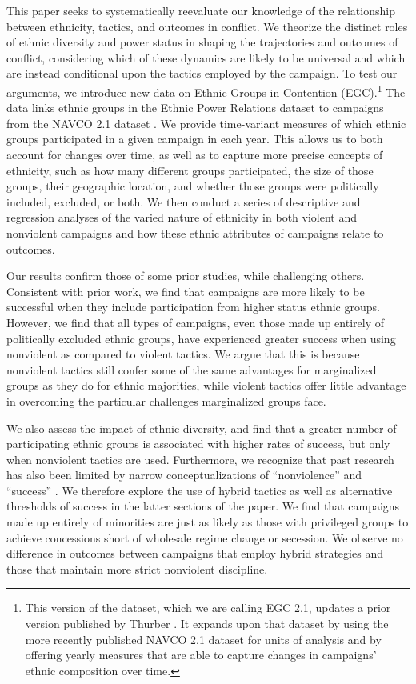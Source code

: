 \documentclass[
  letterpaper,
  DIV=11,
  numbers=noendperiod]{scrartcl}
\begin{document}
This paper seeks to systematically reevaluate our knowledge of the
relationship between ethnicity, tactics, and outcomes in conflict. We
theorize the distinct roles of ethnic diversity and power status in
shaping the trajectories and outcomes of conflict, considering which of
these dynamics are likely to be universal and which are instead
conditional upon the tactics employed by the campaign. To test our
arguments, we introduce new data on Ethnic Groups in Contention
(EGC).\footnote{This version of the dataset, which we are calling EGC
  2.1, updates a prior version published by Thurber
  \autocite*{Thurber2018}. It expands upon that dataset by using the
  more recently published NAVCO 2.1 dataset for units of analysis and by
  offering yearly measures that are able to capture changes in
  campaigns' ethnic composition over time.} The data links ethnic groups
in the Ethnic Power Relations dataset \autocite{Vogt2015} to campaigns
from the NAVCO 2.1 dataset \autocite{Chenoweth2022}. We provide
time-variant measures of which ethnic groups participated in a given
campaign in each year. This allows us to both account for changes over
time, as well as to capture more precise concepts of ethnicity, such as
how many different groups participated, the size of those groups, their
geographic location, and whether those groups were politically included,
excluded, or both. We then conduct a series of descriptive and
regression analyses of the varied nature of ethnicity in both violent
and nonviolent campaigns and how these ethnic attributes of campaigns
relate to outcomes.

Our results confirm those of some prior studies, while challenging
others. Consistent with prior work, we find that campaigns are more
likely to be successful when they include participation from higher
status ethnic groups. However, we find that all types of campaigns, even
those made up entirely of politically excluded ethnic groups, have
experienced greater success when using nonviolent as compared to violent
tactics. We argue that this is because nonviolent tactics still confer
some of the same advantages for marginalized groups as they do for
ethnic majorities, while violent tactics offer little advantage in
overcoming the particular challenges marginalized groups face.

We also assess the impact of ethnic diversity, and find that a greater
number of participating ethnic groups is associated with higher rates of
success, but only when nonviolent tactics are used. Furthermore, we
recognize that past research has also been limited by narrow
conceptualizations of ``nonviolence'' and ``success''
\autocite{Turner2023,Cunningham2023}. We therefore explore the use of
hybrid tactics as well as alternative thresholds of success in the
latter sections of the paper. We find that campaigns made up entirely of
minorities are just as likely as those with privileged groups to achieve
concessions short of wholesale regime change or secession. We observe no
difference in outcomes between campaigns that employ hybrid strategies
and those that maintain more strict nonviolent discipline.
\end{document}
